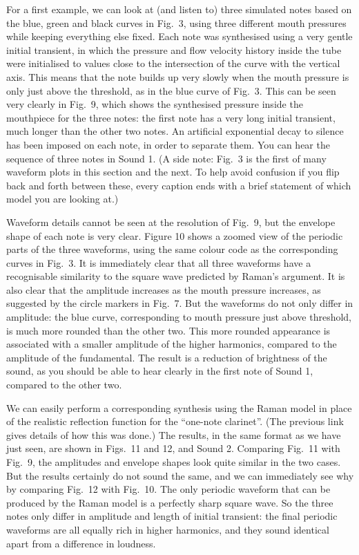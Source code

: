   For a first example, we can look at (and listen to) three simulated notes 
  based on the blue, green and black curves in Fig.\ 3, using three different 
  mouth pressures while keeping everything else fixed. Each note was 
  synthesised using a very gentle initial transient, in which the pressure and 
  flow velocity history inside the tube were initialised to values close to the 
  intersection of the curve with the vertical axis. This means that the note 
  builds up very slowly when the mouth pressure is only just above the 
  threshold, as in the blue curve of Fig.\ 3. This can be seen very clearly in 
  Fig.\ 9, which shows the synthesised pressure inside the mouthpiece for the 
  three notes: the first note has a very long initial transient, much longer 
  than the other two notes. An artificial exponential decay to silence has been 
  imposed on each note, in order to separate them. You can hear the sequence of 
  three notes in Sound 1. (A side note: Fig.\ 3 is the first of many waveform 
  plots in this section and the next. To help avoid confusion if you flip back 
  and forth between these, every caption ends with a brief statement of which 
  model you are looking at.) 

  Waveform details cannot be seen at the resolution of Fig.\ 9, but the 
  envelope shape of each note is very clear. Figure 10 shows a zoomed view of 
  the periodic parts of the three waveforms, using the same colour code as the 
  corresponding curves in Fig.\ 3. It is immediately clear that all three 
  waveforms have a recognisable similarity to the square wave predicted by 
  Raman’s argument. It is also clear that the amplitude increases as the mouth 
  pressure increases, as suggested by the circle markers in Fig.\ 7. But the 
  waveforms do not only differ in amplitude: the blue curve, corresponding to 
  mouth pressure just above threshold, is much more rounded than the other two. 
  This more rounded appearance is associated with a smaller amplitude of the 
  higher harmonics, compared to the amplitude of the fundamental. The result is 
  a reduction of brightness of the sound, as you should be able to hear clearly 
  in the first note of Sound 1, compared to the other two. 

  We can easily perform a corresponding synthesis using the Raman model in 
  place of the realistic reflection function for the “one-note clarinet”. (The 
  previous link gives details of how this was done.) The results, in the same 
  format as we have just seen, are shown in Figs.\ 11 and 12, and Sound 2. 
  Comparing Fig.\ 11 with Fig.\ 9, the amplitudes and envelope shapes look 
  quite similar in the two cases. But the results certainly do not sound the 
  same, and we can immediately see why by comparing Fig.\ 12 with Fig.\ 10. The 
  only periodic waveform that can be produced by the Raman model is a perfectly 
  sharp square wave. So the three notes only differ in amplitude and length of 
  initial transient: the final periodic waveforms are all equally rich in 
  higher harmonics, and they sound identical apart from a difference in 
  loudness. 

